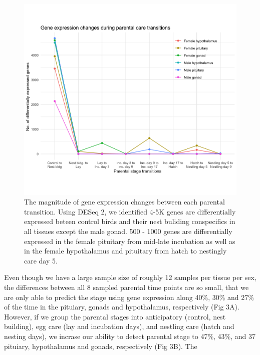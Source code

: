 \documentclass[10pt,letterpaper]{article}
\begin{document}
\begin{figure}
\centering
\includegraphics{characterization_manuscript_files/figure-latex/unnamed-chunk-3-1.pdf}
\caption{The magnitude of gene expression changes between each parental
transition. Using DESeq 2, we identified 4-5K genes are differentially
expressed beteen control birds and their nest buliding conspecifics in
all tissues except the male gonad. 500 - 1000 genes are differentially
expressed in the female pituitary from mid-late incubation as well as in
the female hypothalamus and pituitary from hatch to nestingly care day
5.}
\end{figure}

Even though we have a large sample size of roughly 12 samples per tissue
per sex, the differences between all 8 sampled parental time points are
so small, that we are only able to predict the stage using gene
expression along 40\%, 30\% and 27\% of the time in the pituiary, gonads
and hypothalamus, respectively (Fig 3A). However, if we group the
parental stages into anticipatory (control, nest building), egg care
(lay and incubation days), and nestling care (hatch and nesting days),
we incrase our ability to detect parental stage to 47\%, 43\%, and 37
pituiary, hypothalamus and gonads, respectively (Fig 3B). The
\end{document}
